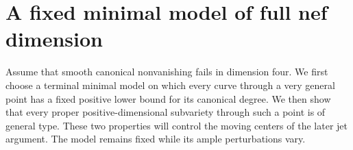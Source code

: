 \section{A fixed minimal model of full nef dimension}\label{sec:reduction}

Assume that smooth canonical nonvanishing fails in dimension four.
We first choose a terminal minimal model on which every curve through
a very general point has a fixed positive lower bound for its
canonical degree. We then show that every proper
positive-dimensional subvariety through such a point is of general
type. These two properties will control the moving centers of the
later jet argument. The model remains fixed while its ample
perturbations vary.


